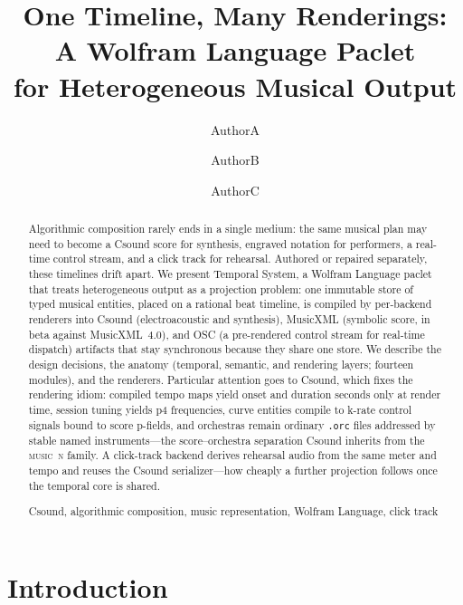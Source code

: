 \documentclass[runningheads,a4paper]{llncs}
\newcommand{\keywords}[1]{\par\addvspace\baselineskip
\noindent\keywordname\enspace\ignorespaces#1}
\begin{document}
\mainmatter

\title{One Timeline, Many Renderings:\\ A Wolfram Language Paclet\\ for Heterogeneous Musical Output}


\author{AuthorA \and AuthorB \and AuthorC}

\maketitle

\begin{abstract}
Algorithmic composition rarely ends in a single medium: the same musical plan
may need to become a Csound score for synthesis, engraved notation for
performers, a real-time control stream, and a click track for rehearsal.
Authored or repaired separately, these timelines drift apart. We present
Temporal System, a Wolfram Language paclet that treats heterogeneous output as
a projection problem: one immutable store of typed musical entities, placed on
a rational beat timeline, is compiled by per-backend renderers into Csound
(electroacoustic and synthesis), MusicXML (symbolic score, in beta against
MusicXML~4.0), and OSC (a pre-rendered control stream for real-time dispatch)
artifacts that stay synchronous because they share one store. We describe the design decisions, the
anatomy (temporal, semantic, and rendering layers; fourteen modules), and the
renderers. Particular attention goes to Csound,
which fixes the rendering idiom: compiled tempo maps yield onset and duration
seconds only at render time, session tuning yields p4 frequencies, curve
entities compile to k-rate control signals bound to score p-fields, and
orchestras remain ordinary \texttt{.orc} files addressed by stable named
instruments---the score--orchestra separation Csound inherits from the
\textsc{music~n} family. A click-track backend derives rehearsal audio from the
same meter and tempo and reuses the Csound serializer---how cheaply a further
projection follows once the temporal core is shared.
\keywords{Csound, algorithmic composition, music representation, Wolfram
Language, click track}
\end{abstract}


\section{Introduction}
\end{document}
